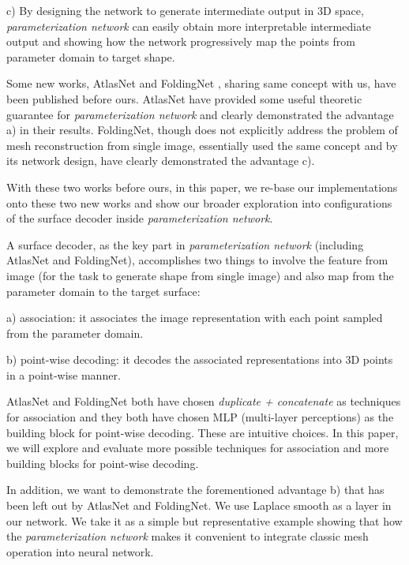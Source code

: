 c) By designing the network to generate intermediate output in 3D space, \emph{parameterization network} can easily obtain more interpretable intermediate output and showing how the network progressively map the points from parameter domain to target shape.   

Some new works, AtlasNet\cite{atlasnet} and FoldingNet\cite{foldingnet} , sharing same concept with us, have been published before ours. AtlasNet\cite{atlasnet} have provided some useful theoretic guarantee for \emph{parameterization network} and clearly demonstrated the advantage a) in their results. FoldingNet\cite{foldingnet}, though does not explicitly address the problem of mesh reconstruction from single image, essentially used the same concept and by its network design, have clearly demonstrated the advantage c). 

With these two works before ours, in this paper, we re-base our implementations onto these two new works and show our broader exploration into configurations of the surface decoder inside \emph{parameterization network}.

A surface decoder, as the key part in \emph{parameterization network} (including AtlasNet\cite{atlasnet} and FoldingNet\cite{foldingnet}), accomplishes two things to involve the feature from image (for the task to generate shape from single image) and also map from the parameter domain to the target surface:
 
a) association: it associates the image representation with each point sampled from the parameter domain. 
 
b) point-wise decoding: it decodes the associated representations into 3D points in a point-wise manner.
 
 AtlasNet\cite{atlasnet} and FoldingNet\cite{foldingnet} both have chosen \emph{duplicate + concatenate} as techniques for association and they both have chosen MLP (multi-layer perceptions) as the building block for point-wise decoding.
These are intuitive choices. In this paper, we will explore and evaluate more possible techniques for association and more building blocks for point-wise decoding.

In addition, we want to demonstrate the forementioned advantage b) that has been left out by AtlasNet\cite{atlasnet} and FoldingNet\cite{foldingnet}. We use Laplace smooth as a layer in our network. We take it as a simple but representative example showing that how the \emph{parameterization network} makes it convenient to integrate classic mesh operation into neural network. 



 